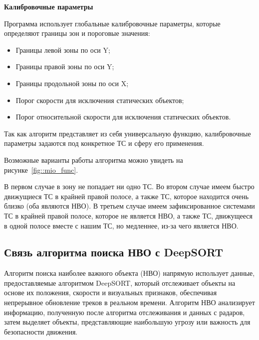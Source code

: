 \textbf{Калибровочные параметры}

Программа использует глобальные калибровочные параметры, которые определяют границы зон и пороговые значения:

\begin{itemize}

    \item Границы левой зоны по оси Y;

    \item Границы правой зоны по оси Y;

    \item Границы продольной зоны по оси X;

    \item Порог скорости для исключения статических объектов;

    \item Порог относительной скорости для исключения статических объектов.

\end{itemize}

Так как алгоритм представляет из себя универсальную функцию, калибровочные параметры задаются под конкретное ТС и сферу его применения. 

Возможные варианты работы алгоритма можно увидеть на рисунке~\ref{fig::mio_func}.


В первом случае в зону не попадает ни одно ТС. Во втором случае имеем быстро движущиеся ТС в крайней правой полосе, а также ТС, которое находится очень близко (оба являются НВО). В третьем случае имеем зафиксированное системами ТС в крайней правой полосе, которое не является НВО, а также ТС, движущееся в одной полосе вместе с нашим ТС, но медленнее, из-за чего является НВО.

\subsection{Связь алгоритма поиска НВО с DeepSORT}

Алгоритм поиска наиболее важного объекта (НВО) напрямую использует данные, предоставляемые алгоритмом DeepSORT, который отслеживает объекты на основе их положения, скорости и визуальных признаков, обеспечивая непрерывное обновление треков в реальном времени. Алгоритм НВО анализирует информацию, полученную после алгоритма отслеживания и данных с радаров, затем выделяет объекты, представляющие наибольшую угрозу или важность для безопасности движения.